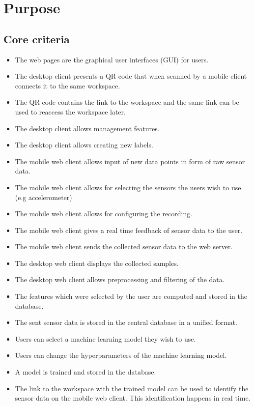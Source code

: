 \section{Purpose}

\subsection{Core criteria}
\begin{itemize}
    \item The web pages are the graphical user interfaces (GUI) for users.
    \item The desktop client presents a QR code that when scanned by a mobile client connects it to the same \gls{workspace}.
    \item The QR code contains the link to the \gls{workspace} and the same link can be used to reaccess the workspace later.
    \item The desktop client allows management features.
    \item The desktop client allows creating new labels.
    \item The mobile web client allows input of new data points in form of raw sensor data.
    \item The mobile web client allows for selecting the sensors the users wish to use. (e.g accelerometer)
    \item The mobile web client allows for configuring the recording.
    \item The mobile web client gives a real time feedback of sensor data to the user.
    \item The mobile web client sends the collected sensor data to the web server.
    \item The desktop web client displays the collected samples.
    \item The desktop web client allows preprocessing and filtering of the data.
    \item The features which were selected by the user are computed and stored in the database.
    \item The sent sensor data is stored in the central database in a unified format.
    \item Users can select a machine learning model they wish to use.
    \item Users can change the hyperparameters of the machine learning model.
    \item A model is trained and stored in the database.
    \item The link to the workspace with the trained model can be used to identify the sensor data on the mobile web client. This identification happens in real time.
\end{itemize}

